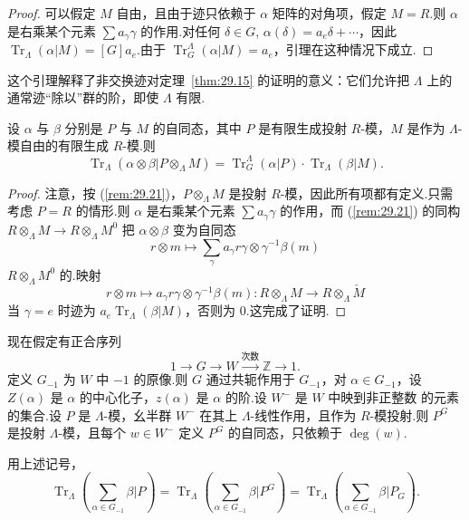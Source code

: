 \begin{proof}
可以假定 $M$ 自由，且由于迹只依赖于 $\alpha$ 矩阵的对角项，假定 $M = R$.则 $\alpha$ 是右乘某个元素 $\sum a_{\gamma}\gamma$ 的作用.对任何 $\delta \in G$, $\alpha(\delta) = a_e\delta + \cdots$，因此 $\operatorname{Tr}_{\Lambda}(\alpha|M) = [G]a_e$.由于 $\operatorname{Tr}^{\Lambda}_{G}(\alpha|M) = a_e$，引理在这种情况下成立.
\end{proof}

这个引理解释了非交换迹对定理~\ref{thm:29.15} 的证明的意义：它们允许把 $\Lambda$ 上的通常迹``除以''群的阶，即使 $\Lambda$ 有限.

\begin{lemma}\label{lem:29.24}
设 $\alpha$ 与 $\beta$ 分别是 $P$ 与 $M$ 的自同态，其中 $P$ 是有限生成投射 $R$-模，$M$ 是作为 $\Lambda$-模自由的有限生成 $R$-模.则
\[
\operatorname{Tr}_{\Lambda}(\alpha \otimes \beta|P \otimes_{\Lambda} M) = \operatorname{Tr}^{\Lambda}_{G}(\alpha|P) \cdot \operatorname{Tr}_{\Lambda}(\beta|M).
\]
\end{lemma}

\begin{proof}
注意，按 (\ref{rem:29.21})，$P \otimes_{\Lambda} M$ 是投射 $R$-模，因此所有项都有定义.只需考虑 $P = R$ 的情形.则 $\alpha$ 是右乘某个元素 $\sum a_{\gamma}\gamma$ 的作用，而 (\ref{rem:29.21}) 的同构 $R \otimes_{\Lambda} M \to R \otimes_{\Lambda} M^{0}$ 把 $\alpha \otimes \beta$ 变为自同态
\[
r \otimes m \mapsto \sum_{\gamma} a_{\gamma} r\gamma \otimes \gamma^{-1}\beta(m)
\]
$R \otimes_{\Lambda} M^{0}$ 的.映射
\[
r \otimes m \mapsto a_{\gamma}r\gamma \otimes \gamma^{-1}\beta(m) \colon R \otimes_{\Lambda} M \to R \otimes_{\Lambda} \check{M}
\]
当 $\gamma = e$ 时迹为 $a_e \operatorname{Tr}_{\Lambda}(\beta|M)$，否则为 0.这完成了证明.
\end{proof}

现在假定有正合序列
\[
1 \to G \to W \xrightarrow{\text{次数}} \mathbb{Z} \to 1.
\]
定义 $G_{-1}$ 为 $W$ 中 $-1$ 的原像.则 $G$ 通过共轭作用于 $G_{-1}$，对 $\alpha \in G_{-1}$，设 $Z(\alpha)$ 是 $\alpha$ 的中心化子，$z(\alpha)$ 是 $\alpha$ 的阶.设 $W^{-}$ 是 $W$ 中映到非正整数 的元素 的集合.设 $P$ 是 $\Lambda$-模，幺半群 $W^{-}$ 在其上 $\Lambda$-线性作用，且作为 $R$-模投射.则 $P^{G}$ 是投射 $\Lambda$-模，且每个 $w \in W^{-}$ 定义 $P^{G}$ 的自同态，只依赖于 $\deg(w)$.

\begin{lemma}\label{lem:29.25}
用上述记号，
\[
\operatorname{Tr}_{\Lambda}\left( \sum_{\alpha \in G_{-1}} \beta|P \right) = \operatorname{Tr}_{\Lambda}\left( \sum_{\alpha \in G_{-1}} \beta|P^{G} \right) = \operatorname{Tr}_{\Lambda}\left( \sum_{\alpha \in G_{-1}} \beta|P_{G} \right).
\]
\end{lemma}

